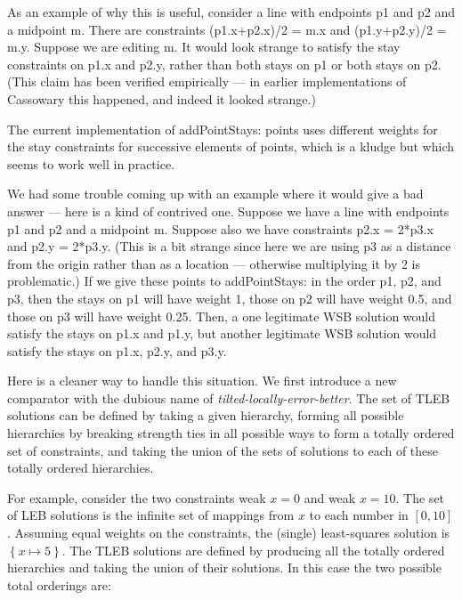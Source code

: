 \documentclass{article}
\newcommand{\strength}{\sf}
\begin{document}
As an example of why this is useful, consider a line with endpoints 
{\sf p1} and {\sf p2} and a midpoint {\sf m}.  There are constraints 
{\sf (p1.x+p2.x)/2 = m.x} and {\sf (p1.y+p2.y)/2 = m.y}.  Suppose we are
editing {\sf m}.  It would look strange to satisfy the stay constraints on
{\sf p1.x} and  {\sf p2.y}, rather than both stays on {\sf p1} or both
stays on {\sf p2}.  (This claim has been verified
empirically --- in earlier implementations of Cassowary this
happened, and indeed it looked strange.)

The current implementation of {\sf addPointStays: points} uses different
weights for the stay constraints for successive elements of {\sf points},
which is a kludge but which seems to work well in practice.

We had some trouble coming up with an example where it would give a bad
answer --- here is a kind of contrived one.  Suppose we have a line with
endpoints {\sf p1} and {\sf p2} and a midpoint {\sf m}.  Suppose also we
have constraints {\sf p2.x = 2*p3.x} and {\sf p2.y = 2*p3.y}.  (This is a
bit strange since here we are using {\sf p3} as a distance from the origin
rather than as a location --- otherwise multiplying it by 2 is
problematic.)  If we give these points to {\sf addPointStays:} in the order
{\sf p1}, {\sf p2}, and {\sf p3}, then the stays on {\sf p1} will have
weight 1, those on {\sf p2} will have weight 0.5, and those on {\sf p3}
will have weight 0.25.  Then, a one legitimate WSB solution would satisfy
the stays on {\sf p1.x} and {\sf p1.y}, but another legitimate WSB solution
would satisfy the stays on {\sf p1.x}, {\sf p2.y}, and {\sf p3.y}.


Here is a cleaner way to handle this situation.  We first introduce a new
comparator with the dubious name of {\em tilted-locally-error-better}.  The
set of TLEB solutions can be defined by taking a given hierarchy, forming
all possible hierarchies by breaking strength ties in all possible ways to
form a totally ordered set of constraints, and taking the union of the sets
of solutions to each of these totally ordered hierarchies.

For example, consider the two constraints {\strength weak} $x=0$ and
{\strength weak} $x=10$.  The set of LEB solutions is the infinite set
of mappings from $x$ to each number in $\left[ 0, 10 \right]$.  Assuming 
equal weights on the constraints, the (single)
least-squares solution is $\left\{ x \mapsto 5 \right\}$.  The TLEB 
solutions are defined by
producing all the totally ordered hierarchies and taking the union of their
solutions.  In this case the two possible total orderings are:
\end{document}
